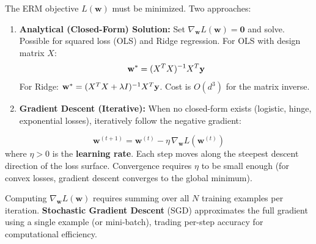 The ERM objective $L(\mathbf{w})$ must be minimized. Two approaches:

\begin{enumerate}
    \item \textbf{Analytical (Closed-Form) Solution:} Set $\nabla_{\mathbf{w}} L(\mathbf{w}) = \mathbf{0}$ and solve. Possible for squared loss (OLS) and Ridge regression. For OLS with design matrix $X$:
    $$\mathbf{w}^* = (X^T X)^{-1} X^T \mathbf{y}$$
    For Ridge: $\mathbf{w}^* = (X^T X + \lambda I)^{-1} X^T \mathbf{y}$. Cost is $O(d^3)$ for the matrix inverse.

    \item \textbf{Gradient Descent (Iterative):} When no closed-form exists (logistic, hinge, exponential losses), iteratively follow the negative gradient:
\end{enumerate}

\begin{definition}
$$\mathbf{w}^{(t+1)} = \mathbf{w}^{(t)} - \eta\, \nabla_{\mathbf{w}} L\!\left(\mathbf{w}^{(t)}\right)$$
where $\eta > 0$ is the \textbf{learning rate}. Each step moves along the steepest descent direction of the loss surface. Convergence requires $\eta$ to be small enough (for convex losses, gradient descent converges to the global minimum).
\end{definition}

\begin{remark}
Computing $\nabla_{\mathbf{w}} L(\mathbf{w})$ requires summing over all $N$ training examples per iteration. \textbf{Stochastic Gradient Descent} (SGD) approximates the full gradient using a single example (or mini-batch), trading per-step accuracy for computational efficiency.
\end{remark}
